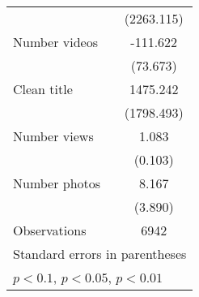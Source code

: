 {\begin{tabular}{l*{1}{c}}
                    &  (2263.115)         \\
[1em]
Number videos       &    -111.622         \\
                    &    (73.673)         \\
[1em]
Clean title         &    1475.242         \\
                    &  (1798.493)         \\
[1em]
Number views        &       1.083\sym{***}\\
                    &     (0.103)         \\
[1em]
Number photos       &       8.167\sym{**} \\
                    &     (3.890)         \\
\hline
Observations        &        6942         \\
\hline\hline
\multicolumn{2}{l}{\footnotesize Standard errors in parentheses}\\
\multicolumn{2}{l}{\footnotesize \sym{*} \(p<0.1\), \sym{**} \(p<0.05\), \sym{***} \(p<0.01\)}\\
\end{tabular}
}
